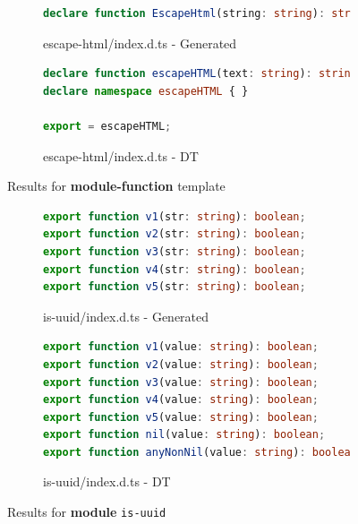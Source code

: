 \documentclass[sigconf]{acmart}
\begin{document}
\begin{figure}[tp]
\begin{subfigure}[t]{0.48\linewidth}
\begin{lstlisting}[language=TypeScript,numbers=none]
declare function EscapeHtml(string: string): string;

        \end{lstlisting}
        \caption{escape-html/index.d.ts - Generated}
      \end{subfigure}
      \hfill
      \begin{subfigure}[t]{0.48\linewidth}
        \begin{lstlisting}[language=TypeScript,numbers=none]
declare function escapeHTML(text: string): string;
declare namespace escapeHTML { }

export = escapeHTML;
        \end{lstlisting}
        \caption{escape-html/index.d.ts - DT}
      \end{subfigure}

    \caption{Results for \textbf{module-function} template}
    \label{fig:experiments-results-module-function}
\end{figure}


\begin{figure}[tp]
  \centering
  \begin{subfigure}[t]{0.48\linewidth}
    \begin{lstlisting}[language=TypeScript,numbers=none]
export function v1(str: string): boolean;
export function v2(str: string): boolean;
export function v3(str: string): boolean;
export function v4(str: string): boolean;
export function v5(str: string): boolean;
    \end{lstlisting}
    \caption{is-uuid/index.d.ts - Generated}
  \end{subfigure}
  \hfill
  \begin{subfigure}[t]{0.48\linewidth}
    \begin{lstlisting}[language=TypeScript,numbers=none]
export function v1(value: string): boolean;
export function v2(value: string): boolean;
export function v3(value: string): boolean;
export function v4(value: string): boolean;
export function v5(value: string): boolean;
export function nil(value: string): boolean;
export function anyNonNil(value: string): boolean;
    \end{lstlisting}
    \caption{is-uuid/index.d.ts - DT}
  \end{subfigure}

  \caption{Results for \textbf{module} \texttt{is-uuid}}
  \label{fig:experiments-results-module-is-uuid}
\end{figure}
\end{document}
